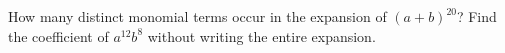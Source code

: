 How many distinct monomial terms occur in the expansion of $(a+b)^{20}$? Find the coefficient of $a^{12}b^8$ without writing the entire expansion.
